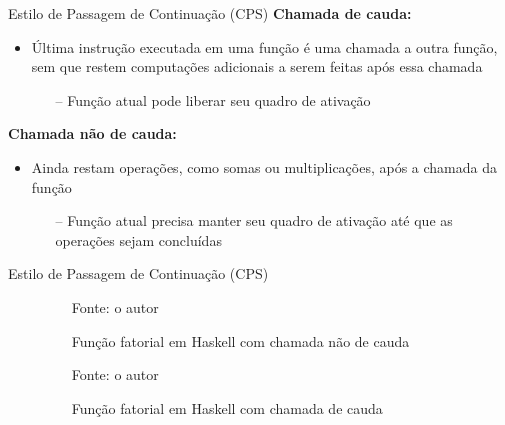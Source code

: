 \begin{frame}{Estilo de Passagem de Continuação (CPS)}
  \textbf{Chamada de cauda:}
  \begin{itemize}
    \item Última instrução executada em uma função é uma chamada a outra função, sem que restem computações adicionais a serem feitas após essa chamada~\cite{MUCHNICK1997}
          \begin{itemize}
            \item[--] Função atual pode liberar seu quadro de ativação
          \end{itemize}
  \end{itemize}
  \textbf{Chamada não de cauda:}
  \begin{itemize}
    \item Ainda restam operações, como somas ou multiplicações, após a chamada da função
          \begin{itemize}
            \item[--] Função atual precisa manter seu quadro de ativação até que as operações sejam concluídas
          \end{itemize}
  \end{itemize}
\end{frame}

\begin{frame}{Estilo de Passagem de Continuação (CPS)}
  \begin{itemize}
    \item[] \begin{figure}
            \caption{Função fatorial em Haskell com chamada não de cauda}
            
            \small{Fonte: o autor}
          \end{figure}

    \item[] \begin{figure}
            \caption{Função fatorial em Haskell com chamada de cauda}
            
            \small{Fonte: o autor}
          \end{figure}
  \end{itemize}
\end{frame}